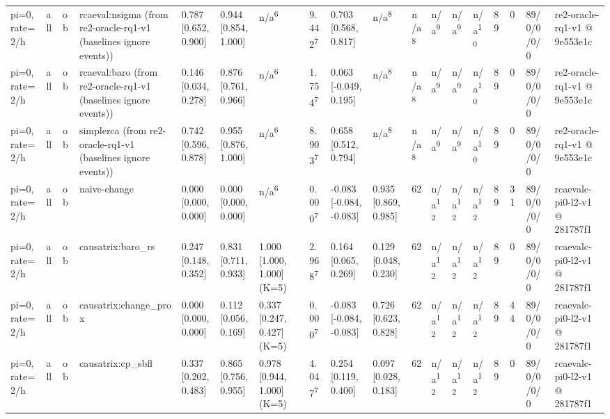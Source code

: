 \begin{table}[t]
\begin{tabular}{llllllllllllllllll}
pi=0, rate=2/h & all & ob & rcaeval:nsigma (from re2-oracle-rq1-v1 (baselines ignore events)) & 0.787 [0.652, 0.900] & 0.944 [0.854, 1.000] & n/a\textsuperscript{6} & 9.442\textsuperscript{7} & 0.703 [0.568, 0.817] & n/a\textsuperscript{8} & n/a\textsuperscript{8} & n/a\textsuperscript{9} & n/a\textsuperscript{9} & n/a\textsuperscript{10} & 89 & 0 & 89/0/0/0/0 & re2-oracle-rq1-v1 @ 9e553e1c \\
pi=0, rate=2/h & all & ob & rcaeval:baro (from re2-oracle-rq1-v1 (baselines ignore events)) & 0.146 [0.034, 0.278] & 0.876 [0.761, 0.966] & n/a\textsuperscript{6} & 1.754\textsuperscript{7} & 0.063 [-0.049, 0.195] & n/a\textsuperscript{8} & n/a\textsuperscript{8} & n/a\textsuperscript{9} & n/a\textsuperscript{9} & n/a\textsuperscript{10} & 89 & 0 & 89/0/0/0/0 & re2-oracle-rq1-v1 @ 9e553e1c \\
pi=0, rate=2/h & all & ob & simplerca (from re2-oracle-rq1-v1 (baselines ignore events)) & 0.742 [0.596, 0.878] & 0.955 [0.876, 1.000] & n/a\textsuperscript{6} & 8.903\textsuperscript{7} & 0.658 [0.512, 0.794] & n/a\textsuperscript{8} & n/a\textsuperscript{8} & n/a\textsuperscript{9} & n/a\textsuperscript{9} & n/a\textsuperscript{10} & 89 & 0 & 89/0/0/0/0 & re2-oracle-rq1-v1 @ 9e553e1c \\
pi=0, rate=2/h & all & ob & naive-change & 0.000 [0.000, 0.000] & 0.000 [0.000, 0.000] & n/a\textsuperscript{6} & 0.000\textsuperscript{7} & -0.083 [-0.084, -0.083] & 0.935 [0.869, 0.985] & 62 & n/a\textsuperscript{12} & n/a\textsuperscript{12} & n/a\textsuperscript{12} & 89 & 31 & 89/0/0/0/0 & rcaevalc-pi0-l2-v1 @ 281787f1 \\
pi=0, rate=2/h & all & ob & causatrix:baro\_rs & 0.247 [0.148, 0.352] & 0.831 [0.711, 0.933] & 1.000 [1.000, 1.000] (K=5) & 2.968\textsuperscript{7} & 0.164 [0.065, 0.269] & 0.129 [0.048, 0.230] & 62 & n/a\textsuperscript{12} & n/a\textsuperscript{12} & n/a\textsuperscript{12} & 89 & 0 & 89/0/0/0/0 & rcaevalc-pi0-l2-v1 @ 281787f1 \\
pi=0, rate=2/h & all & ob & causatrix:change\_prox & 0.000 [0.000, 0.000] & 0.112 [0.056, 0.169] & 0.337 [0.247, 0.427] (K=5) & 0.000\textsuperscript{7} & -0.083 [-0.084, -0.083] & 0.726 [0.623, 0.828] & 62 & n/a\textsuperscript{12} & n/a\textsuperscript{12} & n/a\textsuperscript{12} & 89 & 44 & 89/0/0/0/0 & rcaevalc-pi0-l2-v1 @ 281787f1 \\
pi=0, rate=2/h & all & ob & causatrix:cp\_sbfl & 0.337 [0.202, 0.483] & 0.865 [0.756, 0.955] & 0.978 [0.944, 1.000] (K=5) & 4.047\textsuperscript{7} & 0.254 [0.119, 0.400] & 0.097 [0.028, 0.183] & 62 & n/a\textsuperscript{12} & n/a\textsuperscript{12} & n/a\textsuperscript{12} & 89 & 0 & 89/0/0/0/0 & rcaevalc-pi0-l2-v1 @ 281787f1 \\

\end{tabular}
\end{table}
